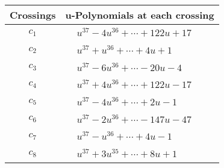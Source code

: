 \documentclass[1p]{elsarticle_modified}
\theoremstyle{definition}
\begin{document}
\begin{tabular}{m{50pt}|m{274pt}}
Crossings & \hspace{64pt}u-Polynomials at each crossing \\
\hline $$\begin{aligned}c_{1}\end{aligned}$$&$\begin{aligned}
&u^{37}-4 u^{36}+\cdots+122 u+17
\end{aligned}$\\
\hline $$\begin{aligned}c_{2}\end{aligned}$$&$\begin{aligned}
&u^{37}+u^{36}+\cdots+4 u+1
\end{aligned}$\\
\hline $$\begin{aligned}c_{3}\end{aligned}$$&$\begin{aligned}
&u^{37}-6 u^{36}+\cdots-20 u-4
\end{aligned}$\\
\hline $$\begin{aligned}c_{4}\end{aligned}$$&$\begin{aligned}
&u^{37}+4 u^{36}+\cdots+122 u-17
\end{aligned}$\\
\hline $$\begin{aligned}c_{5}\end{aligned}$$&$\begin{aligned}
&u^{37}-4 u^{36}+\cdots+2 u-1
\end{aligned}$\\
\hline $$\begin{aligned}c_{6}\end{aligned}$$&$\begin{aligned}
&u^{37}-2 u^{36}+\cdots-147 u-47
\end{aligned}$\\
\hline $$\begin{aligned}c_{7}\end{aligned}$$&$\begin{aligned}
&u^{37}- u^{36}+\cdots+4 u-1
\end{aligned}$\\
\hline $$\begin{aligned}c_{8}\end{aligned}$$&$\begin{aligned}
&u^{37}+3 u^{35}+\cdots+8 u+1
\end{aligned}$\\

\end{tabular}
\end{document}
